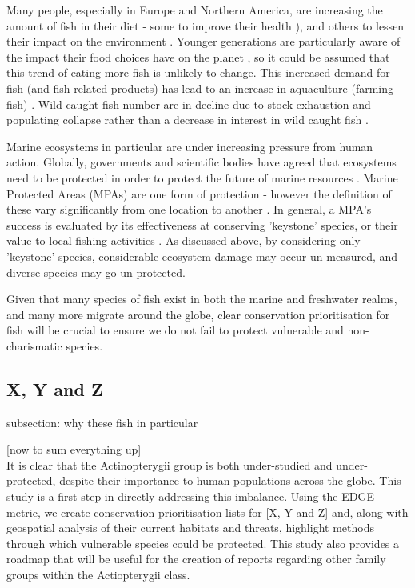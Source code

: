 \documentclass[11pt]{article}
\begin{document}
Many people, especially in Europe and Northern 
America, are increasing the amount of fish in their diet - some to improve 
their health 
\autocite{Rimm2006}), and others to 
lessen their impact on the environment \autocite{Mary2020}. Younger generations 
are particularly aware of the impact their food choices have on the planet 
\autocite{Mary2020}, so it could be assumed that this trend of eating more fish 
is unlikely to change. This increased demand for fish (and fish-related 
products) has lead to an increase in aquaculture (farming fish) 
\autocite{Belton2018}. Wild-caught 
fish number are in decline due to stock exhaustion and 
populating collapse rather than a decrease in interest in wild caught fish 
\autocite{Tremblay2011, Belton2018}. 

Marine ecosystems in particular are under increasing pressure from human 
action. Globally, governments and scientific bodies have agreed that ecosystems 
need to be protected in order to protect the future of marine resources 
\autocite{MurakiGottlieb2018}. Marine Protected Areas (MPAs) are one form of 
protection - 
however the definition of these vary significantly from one location to 
another \autocite{Marinesque2012}. In general,  a MPA's success is evaluated by 
its effectiveness at conserving 'keystone' species, or their value to local 
fishing activities \autocite{Marinesque2012}. As discussed above, by 
considering only 'keystone' species, considerable ecosystem damage may occur 
un-measured, and diverse species may go un-protected. 

Given that many species of fish 
exist in both the marine and freshwater realms, and many more migrate around 
the globe, clear conservation prioritisation for fish will be crucial to ensure 
we do not fail to protect vulnerable and non-charismatic species. 


\subsection{X, Y  and Z}
subsection: why these fish in particular



[now to sum everything up] \\

It is clear that the Actinopterygii group is both under-studied and 
under-protected, despite their importance to human populations across the 
globe. This study is a first step in directly addressing this imbalance. Using 
the EDGE metric, we create conservation prioritisation lists for [X, Y and Z] 
and, along with geospatial analysis of their current habitats and threats, 
highlight methods through which vulnerable species could be protected. This 
study also provides a roadmap that will be useful for the creation of reports 
regarding other family groups within the Actiopterygii class.  
\end{document}
